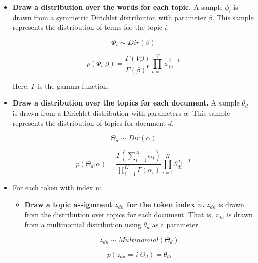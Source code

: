 \begin{itemize}
    \item \textbf{Draw a distribution over the words for each topic.}
        A sample $\phi_i$ is drawn from a symmetric Dirichlet distribution with parameter $\beta$. 
        This sample represents the distribution of terms for the topic $i$.

        \begin{equation}
            \Phi_i \sim Dir(\beta)
        \end{equation}

        \begin{equation}
            p(\Phi_i | \beta) = \frac{\Gamma(V\beta)}{{\Gamma(\beta)}^V} \prod^V_{v=1}\phi^{\beta-1}_{iv}
        \end{equation}

        Here, $\Gamma$ is the gamma function.

    \item \textbf{Draw a distribution over the topics for each document.}
        A sample $\theta_d$ is drawn from a Dirichlet distribution with parameters $\alpha$.
        This sample represents the distribution of topics for document $d$.

        \begin{equation}
            \Theta_d \sim Dir(\alpha)
        \end{equation}

        \begin{equation}
            p(\Theta_d | \alpha) = \frac{\Gamma(\sum^K_{i=1}\alpha_i)}{\prod_{i=1}^K\Gamma(\alpha_i)}\prod_{i=1}^K\theta_{di}^{\alpha_i-1}
        \end{equation}

    \item For each token with index n:

        \begin{itemize}
            \item \textbf{Draw a topic assignment $z_{dn}$ for the token index $n$.} 
                $z_{dn}$ is drawn from the distribution over topics for each document. 
                That is, $z_{dn}$ is drawn from a multinomial distribution using $\theta_d$ as a parameter.

                \begin{equation}
                    z_{dn} \sim Multinomial(\Theta_d)
                \end{equation}

                \begin{equation}
                    p(z_{dn} = i | \Theta_d) = \theta_{di}
                \end{equation}


\end{itemize}
\end{itemize}
